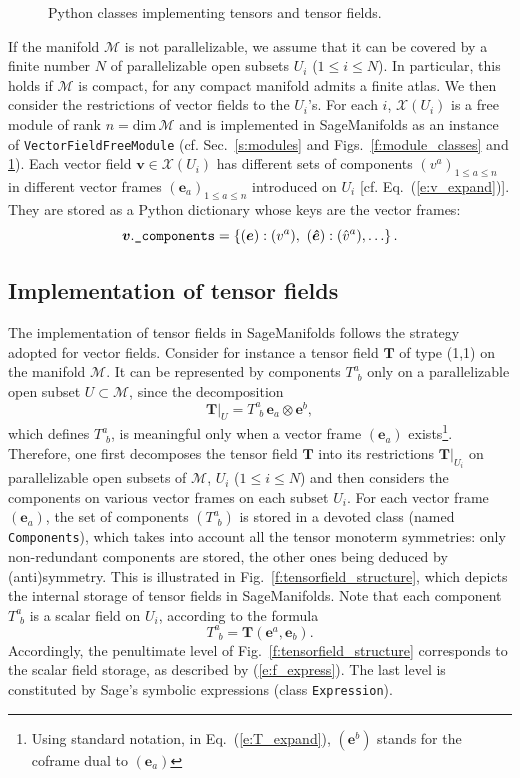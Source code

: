 \documentclass[a4paper]{jpconf}
\newcommand{\soft}[1]{\textsf{#1}}
\newcommand{\code}[1]{\texttt{#1}}
\newcommand{\Sage}{\soft{Sage}}
\newcommand{\SM}{\soft{SageManifolds}}
\newcommand{\be}{\begin{equation}}
\newcommand{\ee}{\end{equation}}
\newcommand{\w}[1]{\bm{#1}}
\begin{document}
\begin{figure}
\begin{center}

\end{center}
\caption{\label{f:tensor_classes} Python classes implementing tensors and tensor fields.}
\end{figure}


If the manifold $\mathcal{M}$ is not parallelizable,
we assume that it can be covered by a finite number $N$
of parallelizable open subsets $U_i$ ($1\leq i \leq N$).
In particular, this holds if $\mathcal{M}$ is compact, for any compact
manifold admits a finite atlas. 
We then consider the restrictions of vector fields to the $U_i$'s.
For each $i$, $\mathscr{X}(U_i)$ is a free module of rank $n=\mathrm{dim}\, \mathcal{M}$ and is implemented in \SM{} as an instance of 
\code{VectorFieldFreeModule} (cf. Sec.~\ref{s:modules} and Figs.~\ref{f:module_classes}
and \ref{f:tensor_classes}). 
Each vector field $\w{v}\in  \mathscr{X}(U_i)$ has different sets
of components $(v^a)_{1\leq a\leq n}$ in different vector frames 
$(\w{e}_a)_{1\leq a \leq n}$ introduced on $U_i$ [cf. Eq.~(\ref{e:v_expand})]. They are stored
as a Python dictionary whose keys are the vector frames:
\be
\w{v}.\mbox{\texttt{\_components}} = \left\{ (\w{e}): (v^a),
\ (\w{\hat e}): ({\hat v}^a), \ldots \right\}. 
\ee


\subsection{Implementation of tensor fields}

The implementation of tensor fields in \SM{} follows the strategy 
adopted for vector fields. Consider for instance a tensor field $\w{T}$ 
of type (1,1) on the manifold $\mathcal{M}$. 
It can be represented by 
components $T^a_{\ \, b}$ only on a parallelizable open subset $U\subset
\mathcal{M}$, since the decomposition 
\be \label{e:T_expand}
    \left. \w{T} \right| _{U} = T^a_{\ \, b} \, \w{e}_a \otimes \w{e}^b ,
\ee
which defines $T^a_{\ \, b}$, is meaningful only when a vector frame 
$(\w{e}_a)$ exists\footnote{Using standard notation, in Eq.~(\ref{e:T_expand}),
$(\w{e}^b)$ stands for the coframe dual to $(\w{e}_a)$}.
Therefore, one first decomposes the tensor field $\w{T}$  into 
its restrictions $\left. \w{T} \right| _{U_i}$ on parallelizable open subsets
of $\mathcal{M}$, $U_i$ ($1\leq i\leq N$) and then considers 
the components on various vector frames on each subset $U_i$.
For each vector frame $(\w{e}_a)$, the set of components $(T^a_{\ \, b})$
is stored in a devoted class (named \code{Components}), which takes into account
all the tensor monoterm symmetries: only non-redundant
components are stored, the other ones being deduced by (anti)symmetry. 
This is illustrated in Fig.~\ref{f:tensorfield_structure}, which depicts the
internal storage of tensor fields in \SM{}. Note that each component
$T^a_{\ \, b}$ is a scalar field on $U_i$, according to the formula
\be
    T^a_{\ \, b} = \w{T}(\w{e}^a, \w{e}_b) . 
\ee
Accordingly, the penultimate level of Fig.~\ref{f:tensorfield_structure} 
corresponds to the scalar field storage, as described by (\ref{e:f_express}).
The last level is constituted by \Sage{}'s symbolic expressions
(class \code{Expression}). 
\end{document}
